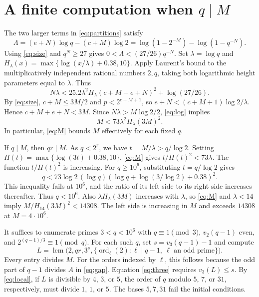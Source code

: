 \documentclass[11pt]{article}
\DeclareMathOperator{\ord}{ord}
\DeclareMathOperator{\lcm}{lcm}
\begin{document}
\section{A finite computation when \texorpdfstring{$q\mid M$}{q divides M}}
\label{sec:finite}

The two larger terms in \eqref{eq:partitions} satisfy
\[
\Lambda=(e+N)\log q-(c+M)\log2
=\log(1-2^{-M})-\log(1-q^{-N}).
\]
Using \eqref{eq:size} and $q^N\ge27$ gives
$0<\Lambda<(27/26)q^{-N}$. Set $\lambda=\log q$ and
$H_\lambda(x)=\max\{\log(x/\lambda)+0.38,10\}$.
Apply Laurent's bound \cite[Corollary~2, $(m,C_2)=(10,25.2)$]{Laurent}
to the multiplicatively independent rational numbers $2,q$, taking
both logarithmic height parameters equal to $\lambda$. Thus
\begin{equation}\label{eq:log}
N\lambda<25.2\lambda^2 H_\lambda(c+M+e+N)^2+\log(27/26).
\end{equation}
By \eqref{eq:size}, $c+M\le3M/2$ and $p<2^{c+M+1}$, so
$e+N<(c+M+1)\log2/\lambda$. Hence $c+M+e+N<3M$.
Since $N\lambda>M\log2/2$, \eqref{eq:log} implies
\begin{equation}\label{eq:M}
M<73\lambda^2 H_\lambda(3M)^2.
\end{equation}
In particular, \eqref{eq:M} bounds $M$ effectively for each fixed $q$.

If $q\mid M$, then $qr\mid M$. As $q<2^r$, we have
$t=M/\lambda>q/\log2$. Setting $H(t)=\max\{\log(3t)+0.38,10\}$,
\eqref{eq:M} gives $t/H(t)^2<73\lambda$. The function $t/H(t)^2$
is increasing. For $q\ge10^6$, substituting $t=q/\log2$ gives
\[
q<73\log2\,(\log q)(\log q+\log(3/\log2)+0.38)^2.
\]
This inequality fails at $10^6$, and the ratio of its left side to its
right side increases thereafter. Thus $q<10^6$. Also
$\lambda H_\lambda(3M)$ increases with $\lambda$, so \eqref{eq:M}
and $\lambda<14$ imply $M/H_{14}(3M)^2<14308$. The left side is
increasing in $M$ and exceeds $14308$ at $M=4\cdot10^6$.

It suffices to enumerate primes $3<q<10^6$ with
$q\equiv1\pmod3$, $v_2(q-1)$ even, and $2^{(q-1)/3}\equiv1\pmod q$.
For each such $q$, set $s=v_3(q-1)-1$ and compute
\[
L=\lcm\bigl(2,qr,3^s,
  \{\ord_\ell(2):\ell\mid q-1,\ \ell\text{ an odd prime}\}\bigr).
\]
Every entry divides $M$. For the orders indexed by $\ell$, this follows
because the odd part of $q-1$ divides $A$ in \eqref{eq:gap}.
Equation \eqref{eq:three} requires $v_3(L)\le s$. By \eqref{eq:local},
if $L$ is divisible by $4$, $3$, or $5$, the order of $q$ modulo $5$,
$7$, or $31$, respectively, must divide $1$, $1$, or $5$.
The bases $5,7,31$ fail the initial conditions.
\end{document}

